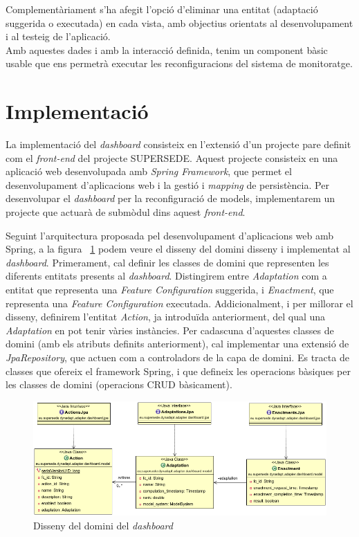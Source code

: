 Complementàriament s'ha afegit l'opció d'eliminar una entitat (adaptació suggerida o executada) en cada vista, amb objectius orientats al desenvolupament i al testeig de l'aplicació.\\

Amb aquestes dades i amb la interacció definida, tenim un component bàsic usable que ens permetrà executar les reconfiguracions del sistema de monitoratge.

\section{Implementació}

La implementació del \textit{dashboard} consisteix en l'extensió d'un projecte pare definit com el \textit{front-end} del projecte SUPERSEDE. Aquest projecte consisteix en una aplicació web desenvolupada amb \textit{Spring Framework}, que permet el desenvolupament d'aplicacions web i la gestió i \textit{mapping} de persistència. Per desenvolupar el \textit{dashboard} per la reconfiguració de models, implementarem un projecte que actuarà de submòdul dins aquest \textit{front-end}.

Seguint l'arquitectura proposada pel desenvolupament d'aplicacions web amb Spring, a la figura ~\ref{fig:Figura34} podem veure el disseny del domini disseny i implementat al \textit{dashboard}. Primerament, cal definir les classes de domini que representen les diferents entitats presents al \textit{dashboard}. Distingirem entre \textit{Adaptation} com a entitat que representa una \textit{Feature Configuration} suggerida, i \textit{Enactment}, que representa una \textit{Feature Configuration} executada. Addicionalment, i per millorar el disseny, definirem l'entitat \textit{Action}, ja introduïda anteriorment, del qual una \textit{Adaptation} en pot tenir vàries instàncies. Per cadascuna d'aquestes classes de domini (amb els atributs definits anteriorment), cal implementar una extensió de \textit{JpaRepository}, que actuen com a controladors de la capa de domini. Es tracta de classes que ofereix el framework Spring, i que defineix les operacions bàsiques per les classes de domini (operacions CRUD bàsicament).\\

\begin{figure}
\centering
\includegraphics[width=14cm]{Figures/Figure34}
\decoRule
\caption{Disseny del domini del \textit{dashboard}}
\label{fig:Figura34}
\end{figure} 

